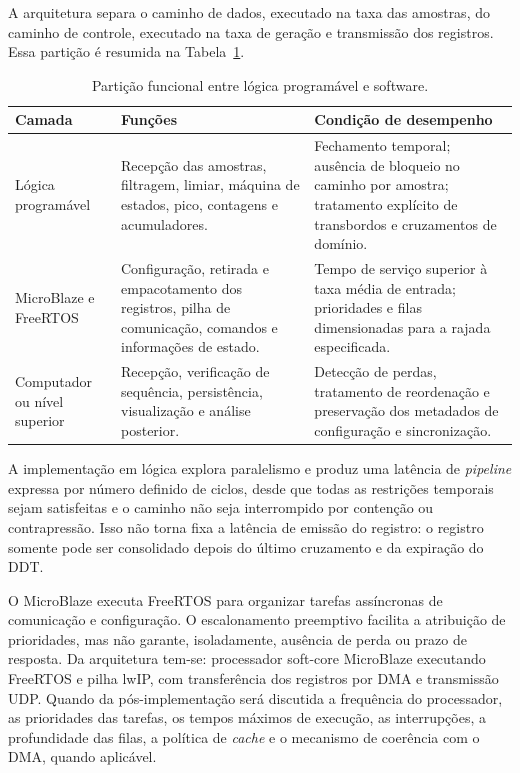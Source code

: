 A arquitetura separa o caminho de dados, executado na taxa das amostras, do caminho de controle, executado na taxa de geração e transmissão dos registros. Essa partição é resumida na Tabela~\ref{v2:tab:particao_hw_sw}.
\begin{table}[htbp]
	\centering
	\footnotesize
	\caption{Partição funcional entre lógica programável e software.}
	\label{v2:tab:particao_hw_sw}
	\renewcommand{\arraystretch}{1.25}
	\begin{tabular}
		{|>{\raggedright\arraybackslash}p{}
			|>{\raggedright\arraybackslash}p{}
			|>{\raggedright\arraybackslash}p{}|}
		\hline
		\textbf{Camada} & \textbf{Funções} & \textbf{Condição de desempenho} \\ 
		\hline
		Lógica programável & Recepção das amostras, filtragem, limiar, máquina de estados, pico, contagens e acumuladores. & Fechamento temporal; ausência de bloqueio no caminho por amostra; tratamento explícito de transbordos e cruzamentos de domínio. \\
		\hline
		MicroBlaze e FreeRTOS & Configuração, retirada e empacotamento dos registros, pilha de comunicação, comandos e informações de estado. & Tempo de serviço superior à taxa média de entrada; prioridades e filas dimensionadas para a rajada especificada. \\
		\hline
		Computador ou nível superior & Recepção, verificação de sequência, persistência, visualização e análise posterior. & Detecção de perdas, tratamento de reordenação e preservação dos metadados de configuração e sincronização. \\
		\hline
	\end{tabular}
\end{table}

A implementação em lógica explora paralelismo e produz uma latência de \textit{pipeline} expressa por número definido de ciclos, desde que todas as restrições temporais sejam satisfeitas e o caminho não seja interrompido por contenção ou contrapressão. Isso não torna fixa a latência de emissão do registro: o registro somente pode ser consolidado depois do último cruzamento e da expiração do DDT.

O MicroBlaze executa FreeRTOS para organizar tarefas assíncronas de comunicação e configuração. O escalonamento preemptivo facilita a atribuição de prioridades, mas não garante, isoladamente, ausência de perda ou prazo de resposta. Da arquitetura tem-se: processador soft-core MicroBlaze executando FreeRTOS e pilha lwIP, com transferência dos registros por DMA e transmissão UDP. Quando da pós-implementação será discutida a frequência do processador, as prioridades das tarefas, os tempos máximos de execução, as interrupções, a profundidade das filas, a política de \textit{cache} e o mecanismo de coerência com o DMA, quando aplicável.

